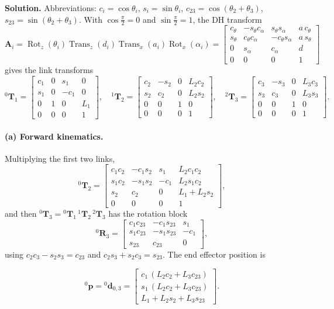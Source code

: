 \documentclass[11pt]{article}
\newcommand{\T}{\bm{T}}
\newcommand{\R}{\bm{R}}
\newcommand{\dvec}{\bm{d}}
\begin{document}
\textbf{Solution.} Abbreviations: $c_i=\cos\theta_i$, $s_i=\sin\theta_i$, $c_{23}=\cos(\theta_2+\theta_3)$, $s_{23}=\sin(\theta_2+\theta_3)$. With $\cos\frac{\pi}{2}=0$ and $\sin\frac{\pi}{2}=1$, the DH transform
\[
\bm{A}_i=\operatorname{Rot}_z(\theta_i)\operatorname{Trans}_z(d_i)\operatorname{Trans}_x(a_i)\operatorname{Rot}_x(\alpha_i)=
\begin{bmatrix}
c_{\theta}&-s_{\theta}c_{\alpha}&s_{\theta}s_{\alpha}&a\,c_{\theta}\\
s_{\theta}&c_{\theta}c_{\alpha}&-c_{\theta}s_{\alpha}&a\,s_{\theta}\\
0&s_{\alpha}&c_{\alpha}&d\\
0&0&0&1
\end{bmatrix}
\]
gives the link transforms
\[
{}^0\T_1=\begin{bmatrix}c_1&0&s_1&0\\s_1&0&-c_1&0\\0&1&0&L_1\\0&0&0&1\end{bmatrix},\quad
{}^1\T_2=\begin{bmatrix}c_2&-s_2&0&L_2c_2\\s_2&c_2&0&L_2s_2\\0&0&1&0\\0&0&0&1\end{bmatrix},\quad
{}^2\T_3=\begin{bmatrix}c_3&-s_3&0&L_3c_3\\s_3&c_3&0&L_3s_3\\0&0&1&0\\0&0&0&1\end{bmatrix}.
\]

\paragraph{(a) Forward kinematics.} Multiplying the first two links,
\[
{}^0\T_2=\begin{bmatrix}c_1c_2&-c_1s_2&s_1&L_2c_1c_2\\s_1c_2&-s_1s_2&-c_1&L_2s_1c_2\\s_2&c_2&0&L_1+L_2s_2\\0&0&0&1\end{bmatrix},
\]
and then ${}^0\T_3={}^0\T_1\,{}^1\T_2\,{}^2\T_3$ has the rotation block
\[
{}^0\R_3=\begin{bmatrix}c_1c_{23}&-c_1s_{23}&s_1\\s_1c_{23}&-s_1s_{23}&-c_1\\s_{23}&c_{23}&0\end{bmatrix},
\]
using $c_2c_3-s_2s_3=c_{23}$ and $c_2s_3+s_2c_3=s_{23}$. The end effector position is
\begin{result}
\[
{}^0\bm{p}={}^0\dvec_{0,3}=\begin{bmatrix}c_1\,(L_2c_2+L_3c_{23})\\ s_1\,(L_2c_2+L_3c_{23})\\ L_1+L_2s_2+L_3s_{23}\end{bmatrix}.
\]
\end{result}
\end{document}
